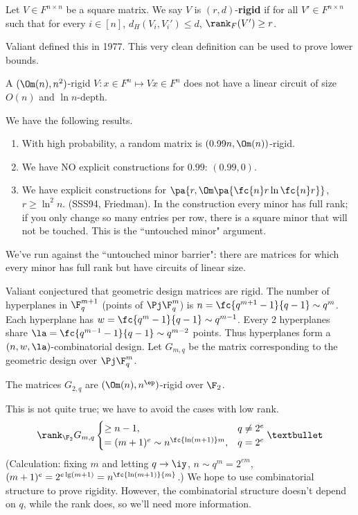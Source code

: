 \begin{df}
Let $V\in F^{n\times n}$ be a square matrix. We say $V$ is $(r,d)$-\textbf{rigid} if for all $V'\in F^{n\times n}$ such that for every $i\in [n]$, $d_H(V_i,V_i')\le d$, $\rank_F(V')\ge r$.
\end{df}
Valiant defined this in 1977. This very clean definition can be used to prove lower bounds.
\begin{lem}
A $(\Om(n),n^2)$-rigid $V:x\in F^n\mapsto Vx\in F^n$ does not have a linear circuit of size $O(n)$ and $\ln n$-depth.
\end{lem}
We have the following results.
\begin{enumerate}
\item
With high probability, a random matrix is $(0.99n, \Om(n))$-rigid.
\item We have NO explicit constructions for $0.99$: $(0.99,0)$.
\item We have explicit constructions for $\pa{r,\Om\pa{\fc{n}r\ln \fc{n}r}}$, $r\ge \ln^2n$. (SSS94, Friedman). In the construction every minor has full rank; if you only change so many entries per row, there is a square minor that will not be touched. This is the ``untouched minor" argument.
\end{enumerate}
We've run against the ``untouched minor barrier": there are matrices for which every minor has full rank but have circuits of linear size.

Valiant conjectured that geometric design matrices are rigid.
The number of hyperplanes in $\F_q^{m+1}$ (points of $\Pj\F_q^m$) is $n=\fc{q^{m+1}-1}{q-1}\sim q^m$. 
Each hyperplane has $w=\fc{q^m-1}{q-1}\sim q^{m-1}$.
Every 2 hyperplanes share $\la = \fc{q^{m-1}-1}{q-1}\sim q^{m-2}$ points.
Thus hyperplanes form a $(n,w,\la)$-combinatorial design. Let $G_{m,q}$ be the matrix corresponding to the geometric design over $\Pj\F_q^m$.
\begin{conj}[Valiant 1977]
The matrices $G_{2,q}$ are $(\Om(n),n^\ep)$-rigid over $\F_2$.
\end{conj}%
This is not quite true; we have to avoid the cases with low rank.
\[
\rank_{\F_2} G_{m,q}\begin{cases}
\ge n-1,&q\ne 2^e\\
=(m+1)^e\sim n^{\fc{\ln(m+1)}m},&q=2^e
\end{cases}•
\]
(Calculation: fixing $m$ and letting $q\to \iy$, $n\sim q^m=2^{em}$, $(m+1)^e=2^{e\lg (m+1)}=n^{\fc{\ln(m+1)}{m}}$.)
We hope to use combinatorial structure to prove rigidity. However, the combinatorial structure doesn't depend on $q$, while the rank does, so we'll need more information.

